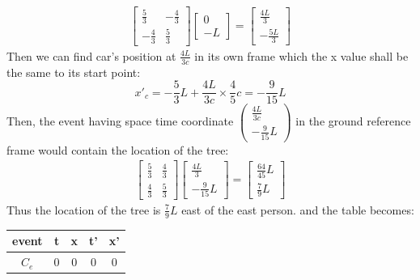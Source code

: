 \documentclass{article}
\begin{document}
\begin{itemize}
\begin{itemize}
\begin{itemize}
            \begin{align*}
                \begin{bmatrix}
                    \frac{5}{3}&-\frac{4}{3}\\
                    -\frac{4}{3}&\frac{5}{3}
                \end{bmatrix}
                \begin{bmatrix}
                    0\\-L
                \end{bmatrix}=
                \begin{bmatrix}
                    \frac{4L}{3}\\
                    -\frac{5L}{3}
                \end{bmatrix}
            \end{align*}
            Then we can find car's position at  \(\frac{4L}{3c}\) in its own frame which the x value shall be the same to its start point:
            \[x'_c = -\frac{5}{3}L+\frac{4L}{3c}\times \frac{4}{5}c=-\frac{9}{15}L\]
            Then, the event having space time coordinate \(\begin{pmatrix}\frac{4L}{3c}\\-\frac{9}{15}L\end{pmatrix}\) in the ground reference frame would contain the location of the tree:
           \begin{align*}
            \begin{bmatrix}
                \frac{5}{3}&\frac{4}{3}\\
                \frac{4}{3}&\frac{5}{3}
            \end{bmatrix}
            \begin{bmatrix}\frac{4L}{3}\\-\frac{9}{15}L\end{bmatrix}=
            \begin{bmatrix}
                \frac{64}{45}L\\
                \frac{7}{9}L
            \end{bmatrix}
           \end{align*}
           Thus the location of the tree is \(\frac{7}{9}L\) east of the east person.
           and the table becomes:
           \begin{center}
            \begin{tabular}{ c c c c c}
            event & t & x & t' &x'\\ \hline
            \(C_e\) & 0&0&0&0 \\  

\end{tabular}
\end{center}
\end{itemize}
\end{itemize}
\end{itemize}
\end{document}
